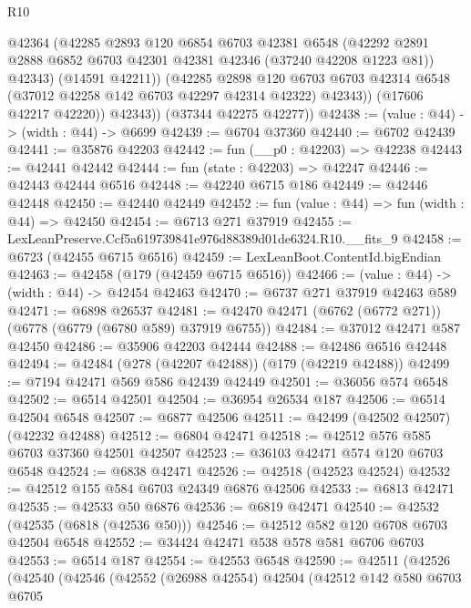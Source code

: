 \begin{lexlean}{R10}
\begin{coremodule}
                @42364
                (@42285
                  @2893
                  @120
                  @6854
                  @6703
                  @42381
                  @6548
                  (@42292 @2891 @2888 @6852 @6703 @42301 @42381 @42346 (@37240 @42208 @1223 @81))
                  @42343)
                (@14591 @42211))
              (@42285
                @2898
                @120
                @6703
                @6703
                @42314
                @6548
                (@37012 @42258 @142 @6703 @42297 @42314 @42322)
                @42343))
            (@17606 @42217 @42220))
          @42343))
      (@37344 @42275 @42277))
@42438 := (value : @44) -> (width : @44) -> @6699
@42439 := @6704 @37360
@42440 := @6702 @42439
@42441 := @35876 @42203
@42442 := fun (__p0 : @42203) => @42238
@42443 := @42441 @42442
@42444 := fun (state : @42203) => @42247
@42446 := @42443 @42444 @6516
@42448 := @42240 @6715 @186
@42449 := @42446 @42448
@42450 := @42440 @42449
@42452 := fun (value : @44) => fun (width : @44) => @42450
@42454 := @6713 @271 @37919
@42455 := LexLeanPreserve.Ccf5a619739841e976d88389d01de6324.R10.__fits_9
@42458 := @6723 (@42455 @6715 @6516)
@42459 := LexLeanBoot.ContentId.bigEndian
@42463 := @42458 (@179 (@42459 @6715 @6516))
@42466 := (value : @44) -> (width : @44) -> @42454 @42463
@42470 := @6737 @271 @37919 @42463 @589
@42471 := @6898 @26537
@42481 := @42470 @42471 (@6762 (@6772 @271)) (@6778 (@6779 (@6780 @589) @37919 @6755))
@42484 := @37012 @42471 @587 @42450
@42486 := @35906 @42203 @42444
@42488 := @42486 @6516 @42448
@42494 := @42484 (@278 (@42207 @42488)) (@179 (@42219 @42488))
@42499 := @7194 @42471 @569 @586 @42439 @42449
@42501 := @36056 @574 @6548
@42502 := @6514 @42501
@42504 := @36954 @26534 @187
@42506 := @6514 @42504 @6548
@42507 := @6877 @42506
@42511 := @42499 (@42502 @42507) (@42232 @42488)
@42512 := @6804 @42471
@42518 := @42512 @576 @585 @6703 @37360 @42501 @42507
@42523 := @36103 @42471 @574 @120 @6703 @6548
@42524 := @6838 @42471
@42526 := @42518 (@42523 @42524)
@42532 := @42512 @155 @584 @6703 @24349 @6876 @42506
@42533 := @6813 @42471
@42535 := @42533 @50 @6876
@42536 := @6819 @42471
@42540 := @42532 (@42535 (@6818 (@42536 @50)))
@42546 := @42512 @582 @120 @6708 @6703 @42504 @6548
@42552 := @34424 @42471 @538 @578 @581 @6706 @6703
@42553 := @6514 @187
@42554 := @42553 @6548
@42590 := @42511
    (@42526
      (@42540
        (@42546
          (@42552
            (@26988 @42554)
            @42504
            (@42512
              @142
              @580
              @6703
              @6705

\end{coremodule}
\end{lexlean}

